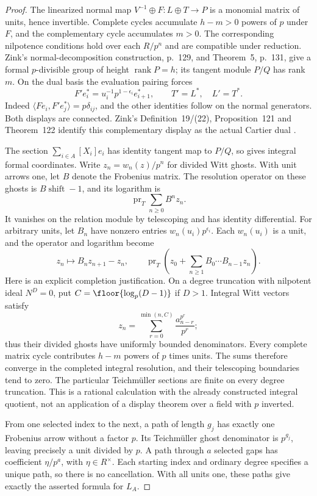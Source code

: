 \begin{proof}
The linearized normal map $V^{-1}\oplus F:L\oplus T\to P$ is a monomial matrix of units, hence invertible. Complete cycles accumulate $h-m>0$ powers of $p$ under $F$, and the complementary cycle accumulates $m>0$. The corresponding nilpotence conditions hold over each $R/p^n$ and are compatible under reduction. Zink's normal-decomposition construction, p.~129, and Theorem~5, p.~131, give a formal $p$-divisible group of height $\operatorname{rank}P=h$; its tangent module $P/Q$ has rank $m$. On the dual basis the evaluation pairing forces
\[
 F'e_i^*=u_i^{-1}p^{1-\epsilon_i}e_{i+1}^*,\qquad
 T'=L^*,\quad L'=T^*.
\]
Indeed $\langle Fe_i,F'e_j^*\rangle=p\delta_{ij}$, and the other identities follow on the normal generators. Both displays are connected. Zink's Definition~19/(22), Proposition~121 and Theorem~122 identify this complementary display as the actual Cartier dual \cite{Zink}.

The section $\sum_{i\in A}[X_i]e_i$ has identity tangent map to $P/Q$, so gives integral formal coordinates. Write $z_n=w_n(z)/p^n$ for divided Witt ghosts. With unit arrows one, let $B$ denote the Frobenius matrix. The resolution operator on these ghosts is $B\operatorname{shift}-1$, and its logarithm is
\[
 \operatorname{pr}_T\sum_{n\ge0}B^nz_n.
\]
It vanishes on the relation module by telescoping and has identity differential. For arbitrary units, let $B_n$ have nonzero entries $w_n(u_i)p^{\epsilon_i}$. Each $w_n(u_i)$ is a unit, and the operator and logarithm become
\[
 z_n\longmapsto B_nz_{n+1}-z_n,\qquad
 \operatorname{pr}_T\left(z_0+\sum_{n\ge1}B_0\cdots B_{n-1}z_n\right).
\]
Here is an explicit completion justification. On a degree truncation with nilpotent ideal $N^D=0$, put $C=\floor{\log_p(D-1)}$ if $D>1$. Integral Witt vectors satisfy
\[
 z_n=\sum_{r=0}^{\min(n,C)}
       \frac{a_{n-r}^{p^r}}{p^r};
\]
thus their divided ghosts have uniformly bounded denominators. Every complete matrix cycle contributes $h-m$ powers of $p$ times units. The sums therefore converge in the completed integral resolution, and their telescoping boundaries tend to zero. The particular Teichm\"uller sections are finite on every degree truncation. This is a rational calculation with the already constructed integral quotient, not an application of a display theorem over a field with $p$ inverted.

From one selected index to the next, a path of length $g_j$ has exactly one Frobenius arrow without a factor $p$. Its Teichm\"uller ghost denominator is $p^{g_j}$, leaving precisely a unit divided by $p$. A path through $a$ selected gaps has coefficient $\eta/p^a$, with $\eta\in R^\times$. Each starting index and ordinary degree specifies a unique path, so there is no cancellation. With all units one, these paths give exactly the asserted formula for $L_A$.


\end{proof}
